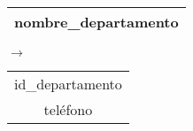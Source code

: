   \begin{center}
    \begin{minipage}{4.4cm}{\begin{flushright}\begin{tabular}{ | c | }
                  \hline
                  nombre\_departamento \\
                  \hline
                 \end{tabular}\end{flushright} }
    \end{minipage}
    \begin{minipage}{0.8cm}{$\longrightarrow$}
    \end{minipage}
    \begin{minipage}{5.9cm}{\begin{tabular}{ | c | }
                  \hline
                  id\_departamento \\
                  teléfono \\
                  \hline
                 \end{tabular} }
    \end{minipage}
  \end{center}